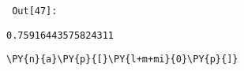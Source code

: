 \par\vspace{1\smallerfontscale}%
    
        {\par%
        \vspace{-1\smallerfontscale}%
        \noindent%
        \begin{minipage}{\cellleftmargin}%
    \hfill%
    {\smaller%
    \tt%
    \color{nbframe-out-prompt}%
    Out[47]:}%
    \hspace{\inputpadding}%
    \hspace{0em}%
    \hspace{3pt}%
    \end{minipage}%
        }%
    \begin{addmargin}[\cellleftmargin]{0em}%
    {\smaller%
    \vspace{-1\smallerfontscale}%
    
    
    
    \begin{verbatim}
0.75916443575824311
    \end{verbatim}

    
}%
    \end{addmargin}%

{\par%
\vspace{-1\baselineskip}%
}%
\begin{notebookcell}[48]%
\begin{addmargin}[\cellleftmargin]{0em}%
{\smaller%
\par%
%
\vspace{-1\smallerfontscale}%
\begin{Verbatim}[commandchars=\\\{\}]
\PY{n}{a}\PY{p}{[}\PY{l+m+mi}{0}\PY{p}{]}
\end{Verbatim}
%
\par%
\vspace{-1\smallerfontscale}}%
\end{addmargin}
\end{notebookcell}

\par\vspace{1\smallerfontscale}%
    
